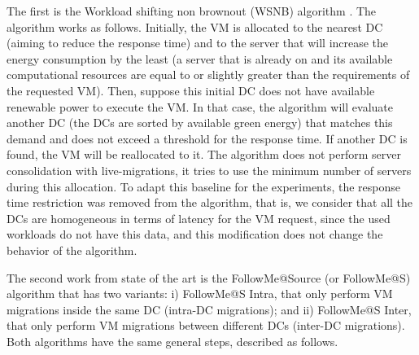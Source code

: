 The first is the Workload shifting non brownout (WSNB) algorithm \cite{XU2020191}. The algorithm works as follows. Initially, the VM is allocated to the nearest DC (aiming to reduce the response time) and to the server that will increase the energy consumption by the least (a server that is already on and its available computational resources are equal to or slightly greater than the requirements of the requested VM). Then, suppose this initial DC does not have available renewable power to execute the VM. In that case, the algorithm will evaluate another DC (the DCs are sorted by available green energy) that matches this demand and does not exceed a threshold for the response time. If another DC is found, the VM will be reallocated to it. The algorithm does not perform server consolidation with live-migrations, it tries to use the minimum number of servers during this allocation. To adapt this baseline for the experiments, the response time restriction was removed from the algorithm, that is, we consider that all the DCs are homogeneous in terms of latency for the VM request, since the used workloads do not have this data, and this modification does not change the behavior of the algorithm.

The second work from state of the art is the FollowMe@Source (or FollowMe@S) algorithm \cite{ALI2021110907} that has two variants: i) FollowMe@S Intra, that only perform VM migrations inside the same DC (intra-DC migrations);  and ii) FollowMe@S Inter, that only perform VM migrations between different DCs (inter-DC migrations). Both algorithms have the same general steps, described as follows.


